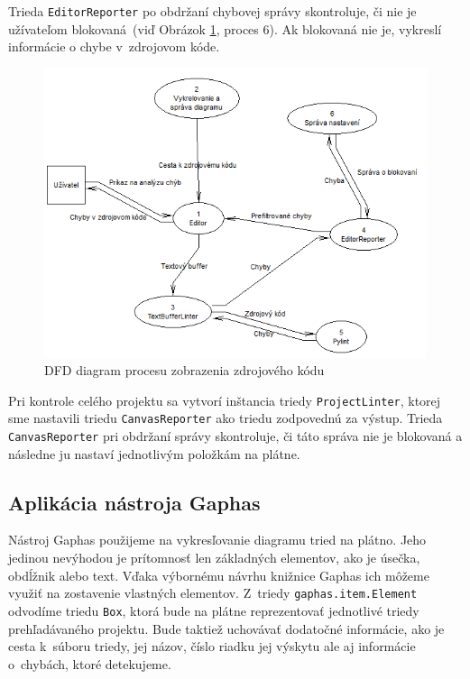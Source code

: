 \documentclass[11pt,oneside,final]{fithesis2}
\begin{document}
		Trieda \texttt{EditorReporter} po obdržaní chybovej správy skontroluje, či nie je užívateľom blokovaná~(viď Obrázok \ref{dfddisplay}, proces 6). Ak blokovaná nie je, vykreslí informácie o chybe v~zdrojovom kóde.

	
	\begin{figure}[htb]
	 \centering
	 \includegraphics[width=\textwidth]{images/dfd_editor}
	 \caption{DFD diagram procesu zobrazenia zdrojového kódu}
	 \label{dfddisplay}
	\end{figure}
	
		
	Pri kontrole celého projektu sa vytvorí inštancia triedy \texttt{ProjectLinter}, ktorej sme nastavili triedu \texttt{CanvasReporter} ako triedu zodpovednú za výstup. Trieda \texttt{CanvasReporter} pri obdržaní správy skontroluje, či táto správa nie je blokovaná a následne ju nastaví jednotlivým položkám na plátne.
 
		\subsection{Aplikácia nástroja Gaphas}
		
		Nástroj Gaphas použijeme na vykresľovanie diagramu tried na plátno. Jeho jedinou nevýhodou je prítomnosť len základných elementov, ako je úsečka, obdĺžnik alebo text. Vďaka výbornému návrhu knižnice Gaphas ich môžeme využiť na zostavenie vlastných elementov. Z~triedy \texttt{gaphas.item.Element} odvodíme triedu \texttt{Box}, ktorá bude na plátne reprezentovať jednotlivé triedy prehľadávaného projektu. Bude taktiež uchovávať dodatočné informácie, ako je cesta k~súboru triedy, jej názov, číslo riadku jej výskytu ale aj informácie o~chybách, ktoré detekujeme.
		
\end{document}
